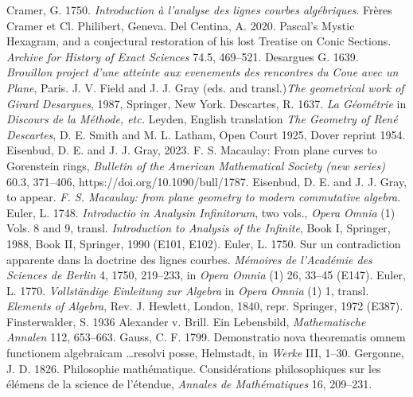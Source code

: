 \newline\indent Cramer, G. 1750. \emph{Introduction \`a l'analyse des lignes courbes alg\'ebriques}. Fr\`eres Cramer et Cl. Philibert, Geneva.
\newline\indent Del Centina, A. 2020. Pascal's Mystic Hexagram, and a conjectural restoration of his lost Treatise on Conic Sections. \emph{Archive for History of Exact Sciences} 74.5, 469--521.
\newline\indent Desargues G. 1639. \emph{Brouillon project d'une atteinte aux evenements des rencontres du Cone avec un Plane}, Paris.  J. V. Field  and J. J. Gray (eds. and transl.)\emph{The geometrical work of Girard Desargues}, 1987, Springer, New York.
\newline\indent Descartes, R. 1637. \emph{La G\'eom\'etrie} in \emph{Discours de la M\'ethode, etc.} Leyden, English translation \emph{The Geometry of Ren\'e Descartes}, D. E. Smith and M. L. Latham, Open Court 1925, Dover reprint 1954.
\newline\indent Eisenbud, D. E. and J. J. Gray, 2023. F. S. Macaulay: From plane curves to Gorenstein rings, \emph{Bulletin  of the American Mathematical Society (new series)} 
60.3,  371--406, https://doi.org/10.1090/bull/1787.
\newline\indent Eisenbud, D. E. and J. J. Gray, to appear. \emph{F. S. Macaulay: from plane geometry to modern commutative algebra}.
\newline\indent  Euler, L. 1748. \emph{Introductio in Analysin Infinitorum}, two vols., \emph{Opera Omnia} (1) Vols. 8 and 9, transl. \emph{Introduction to Analysis of the Infinite}, Book I,  Springer, 1988, Book II, Springer, 1990 (E101, E102).
\newline\indent  Euler, L. 1750.  Sur un contradiction apparente dans la doctrine des lignes courbes. \emph{M\'emoires de l'Acad\'emie des Sciences de Berlin} 4, 1750, 219--233, in  \emph{Opera Omnia} (1)   26, 33--45 (E147).
\newline\indent Euler, L. 1770. \emph{Vollst\"andige Einleitung zur Algebra} in \emph{Opera Omnia} (1) 1,  transl. \emph{Elements of Algebra}, Rev. J. Hewlett, London, 1840, repr.  Springer, 1972 (E387).
\newline\indent Finsterwalder, S. 1936 Alexander v. Brill. Ein Lebensbild, \emph{Mathematische Annalen} 112, 653--663.
\newline\indent Gauss, C. F.  1799. Demonstratio nova theorematis omnem functionem algebraicam \ldots resolvi posse, Helmstadt, in \emph{Werke} III, 1--30.
\newline\indent Gergonne, J. D. 1826. Philosophie math\'ematique. Consid\'erations philo\-sophiques sur les \'el\'emens de la science de l'\'etendue, \emph{Annales de Math\'ematiques} 16, 209--231.
